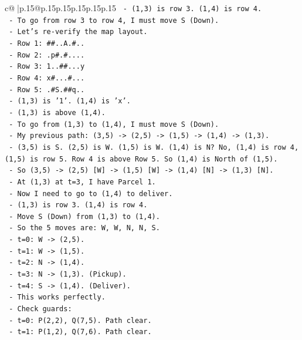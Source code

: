 \documentclass{article}
\begin{document}
{\begin{supertabular}{c@{$\;$}|p{.15\linewidth}@{}p{.15\linewidth}p{.15\linewidth}p{.15\linewidth}p{.15\linewidth}p{.15\linewidth}}
{{{\texttt{    {-} (1,3) is row 3. (1,4) is row 4.} \\
\texttt{    {-} To go from row 3 to row 4, I must move S (Down).} \\
\texttt{    {-} Let's re{-}verify the map layout.} \\
\texttt{      {-} Row 1: \#\#..A.\#..} \\
\texttt{      {-} Row 2: .p\#.\#....} \\
\texttt{      {-} Row 3: 1..\#\#...y} \\
\texttt{      {-} Row 4: x\#...\#...} \\
\texttt{      {-} Row 5: .\#S.\#\#q..} \\
\texttt{    {-} (1,3) is '1'. (1,4) is 'x'.} \\
\texttt{    {-} (1,3) is above (1,4).} \\
\texttt{    {-} To go from (1,3) to (1,4), I must move S (Down).} \\
\texttt{    {-} My previous path: (3,5) {-}> (2,5) {-}> (1,5) {-}> (1,4) {-}> (1,3).} \\
\texttt{    {-} (3,5) is S. (2,5) is W. (1,5) is W. (1,4) is N? No, (1,4) is row 4, (1,5) is row 5. Row 4 is above Row 5. So (1,4) is North of (1,5).} \\
\texttt{    {-} So (3,5) {-}> (2,5) {[}W{]} {-}> (1,5) {[}W{]} {-}> (1,4) {[}N{]} {-}> (1,3) {[}N{]}.} \\
\texttt{    {-} At (1,3) at t=3, I have Parcel 1.} \\
\texttt{    {-} Now I need to go to (1,4) to deliver.} \\
\texttt{    {-} (1,3) is row 3. (1,4) is row 4.} \\
\texttt{    {-} Move S (Down) from (1,3) to (1,4).} \\
\texttt{    {-} So the 5 moves are: W, W, N, N, S.} \\
\texttt{    {-} t=0: W {-}> (2,5).} \\
\texttt{    {-} t=1: W {-}> (1,5).} \\
\texttt{    {-} t=2: N {-}> (1,4).} \\
\texttt{    {-} t=3: N {-}> (1,3). (Pickup).} \\
\texttt{    {-} t=4: S {-}> (1,4). (Deliver).} \\
\texttt{    {-} This works perfectly.} \\
\texttt{    {-} Check guards:} \\
\texttt{      {-} t=0: P(2,2), Q(7,5). Path clear.} \\
\texttt{      {-} t=1: P(1,2), Q(7,6). Path clear.} \\
}}}
\end{supertabular}}
\end{document}
